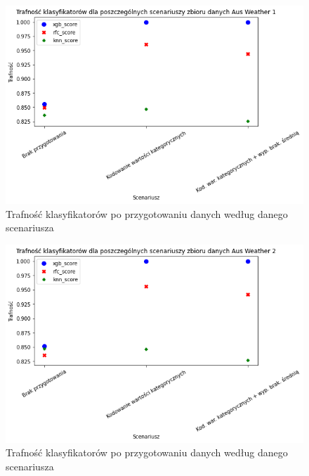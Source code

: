 \documentclass{book}
\begin{document}
\begin{figure}[H]
\centerline{\includegraphics[scale=0.5]{Aus_Weather_1_Kodowanie}}
\centering
\caption{Trafność klasyfikatorów po przygotowaniu danych 
według danego scenariusza}
\end{figure}

\begin{figure}[H]
\centerline{\includegraphics[scale=0.5]{Aus_Weather_2_Kodowanie}}
\centering
\caption{Trafność klasyfikatorów po przygotowaniu danych 
według danego scenariusza}
\end{figure}
\end{document}
